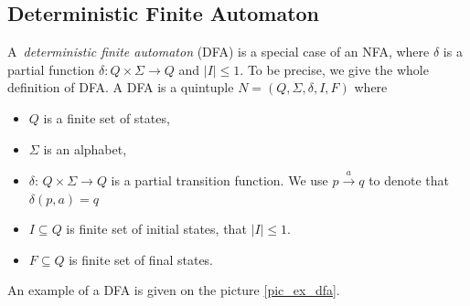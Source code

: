 	\subsection{Deterministic Finite Automaton}
	\label{defDFA}
  A~\emph{deterministic finite automaton} (DFA) is a special case of an NFA, where $\delta$ is a partial function 
$\delta: Q\times \Sigma \to Q$ and $|I| \leq 1$. To be precise, we give the whole definition of DFA.\newline
\newline
		A DFA is a quintuple $N=(Q,\Sigma,\delta,I,F)$ where
		\begin{itemize}
			\item $Q$ is a finite set of states,
			\item $\Sigma$ is  an alphabet,
			\item $\delta$:  $Q \times \Sigma \to Q$ is a partial transition function. We use $p \xrightarrow{a} q$ to denote that $\delta(p,a)=q$
			\item $I\subseteq Q$ is finite set of initial states, that $|I| \leq 1$.
			\item $F\subseteq Q$ is finite set of final states.
		\end{itemize}
    An example of a DFA is given on the picture \ref{pic_ex_dfa}.


